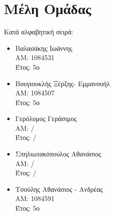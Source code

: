 \section*{Μέλη Ομάδας}
Κατά αλφαβητική σειρά: 
\begin{itemize}
    \item {
        Βαλασάκης Ιωάννης \\
        ΑΜ: 1084531 \\ 
        Έτος: 5ο
    }
    \item {
        Βουγιουκλής Ξέρξης- Εμμανουήλ \\
        ΑΜ: 1084507 \\
        Έτος: 5ο
    }
    \item {
        Γερόλυμος Γεράσιμος \\ 
        ΑΜ: / \\
        Έτος: / 
    }
    \item {
        Σπηλιωτακόπουλος Αθανάσιος \\
        ΑΜ: / \\
        Έτος: / 
    }
    \item {
        Τσούλης Αθανάσιος - Ανδρέας \\ 
        ΑΜ: 1084591 \\ 
        Έτος: 5ο 
    }
\end{itemize}
